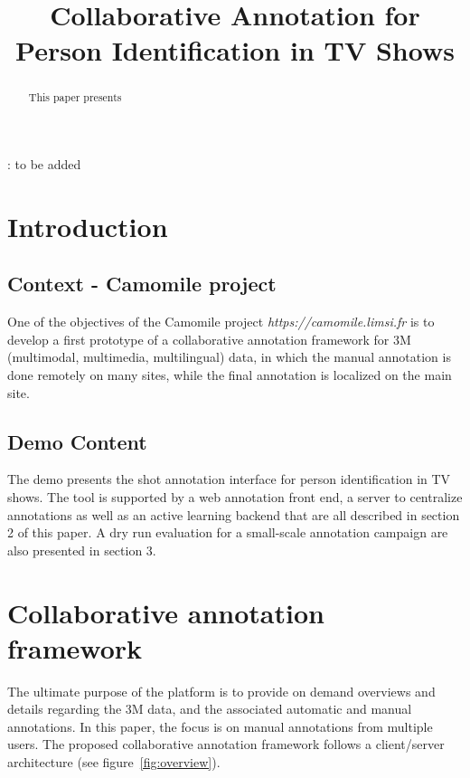 \documentclass[a4paper]{article}
\title{Collaborative Annotation for Person Identification in TV Shows}
\begin{document}
  \maketitle
  \begin{abstract}
This paper presents 
  \end{abstract}
  : to be added

  \section{Introduction}
      \subsection{Context - Camomile project}
One of the objectives of the Camomile project \textit{https://camomile.limsi.fr} is to develop a first prototype of a collaborative annotation framework for 3M (multimodal, multimedia, multilingual) data, in which the manual annotation is done remotely on many sites, while the final annotation is localized on the main site. 


 \subsection{Demo Content}
The demo presents the shot annotation interface for person identification in TV shows. The tool is supported by a web annotation front end, a server to centralize annotations as well as an active learning backend that are all described in section 2 of this paper. A dry run evaluation for a small-scale annotation campaign are also presented in section 3.


      \section{Collaborative annotation framework}

The ultimate purpose of the platform is to provide on demand overviews and details regarding the 3M data, and the associated automatic and manual annotations. In this paper, the focus is on manual annotations from multiple users. The proposed collaborative annotation framework follows a client/server architecture (see figure~\ref{fig:overview}). 
\end{document}
